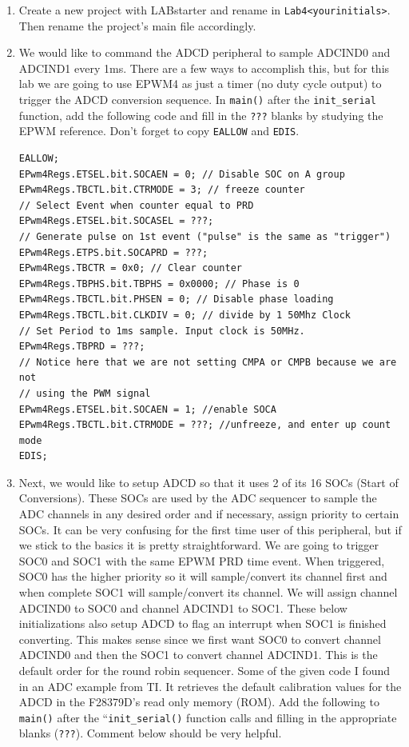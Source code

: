 \documentclass[11pt]{article}
\begin{document}
\begin{enumerate}
    \item Create a new project with LABstarter and rename in \lstinline|Lab4<yourinitials>|. Then rename the project’s main file accordingly.
        \item We would like to command the ADCD peripheral to sample ADCIND0 and ADCIND1 every 1ms. There are a few ways to accomplish this, but for this lab we are going to use EPWM4 as just a timer (no duty cycle output) to trigger the ADCD conversion sequence. In \texttt{main()} after the \texttt{init_serial} function, add the following code and fill in the \texttt{???} blanks by studying the EPWM reference. Don’t forget to copy \texttt{EALLOW} and \texttt{EDIS}.
\begin{verbatim}
EALLOW;
EPwm4Regs.ETSEL.bit.SOCAEN = 0; // Disable SOC on A group
EPwm4Regs.TBCTL.bit.CTRMODE = 3; // freeze counter
// Select Event when counter equal to PRD
EPwm4Regs.ETSEL.bit.SOCASEL = ???;
// Generate pulse on 1st event ("pulse" is the same as "trigger")
EPwm4Regs.ETPS.bit.SOCAPRD = ???;
EPwm4Regs.TBCTR = 0x0; // Clear counter
EPwm4Regs.TBPHS.bit.TBPHS = 0x0000; // Phase is 0
EPwm4Regs.TBCTL.bit.PHSEN = 0; // Disable phase loading
EPwm4Regs.TBCTL.bit.CLKDIV = 0; // divide by 1 50Mhz Clock
// Set Period to 1ms sample. Input clock is 50MHz.
EPwm4Regs.TBPRD = ???;
// Notice here that we are not setting CMPA or CMPB because we are not
// using the PWM signal
EPwm4Regs.ETSEL.bit.SOCAEN = 1; //enable SOCA
EPwm4Regs.TBCTL.bit.CTRMODE = ???; //unfreeze, and enter up count mode
EDIS;
\end{verbatim}
        \item Next, we would like to setup ADCD so that it uses 2 of its 16 SOCs (Start of Conversions). These SOCs are used by the ADC sequencer to sample the ADC channels in any desired order and if necessary, assign priority to certain SOCs. It can be very confusing for the first time user of this peripheral, but if we stick to the basics it is pretty straightforward. We are going to trigger SOC0 and SOC1 with the same EPWM PRD time event. When triggered, SOC0 has the higher priority so it will sample/convert its channel first and when complete SOC1 will sample/convert its channel. We will assign channel ADCIND0 to SOC0 and channel ADCIND1 to SOC1. These below initializations also setup ADCD to flag an interrupt when SOC1 is finished converting. This makes sense since we first want SOC0 to convert channel ADCIND0 and then the SOC1 to convert channel ADCIND1. This is the default order for the round robin sequencer. Some of the given code I found in an ADC example from TI. It retrieves the default calibration values for the ADCD in the F28379D’s read only memory (ROM). Add the following to \texttt{main()} after the “\texttt{init_serial()} function calls and filling in the appropriate blanks (\texttt{???}). Comment below should be very helpful.

\end{enumerate}
\end{document}
